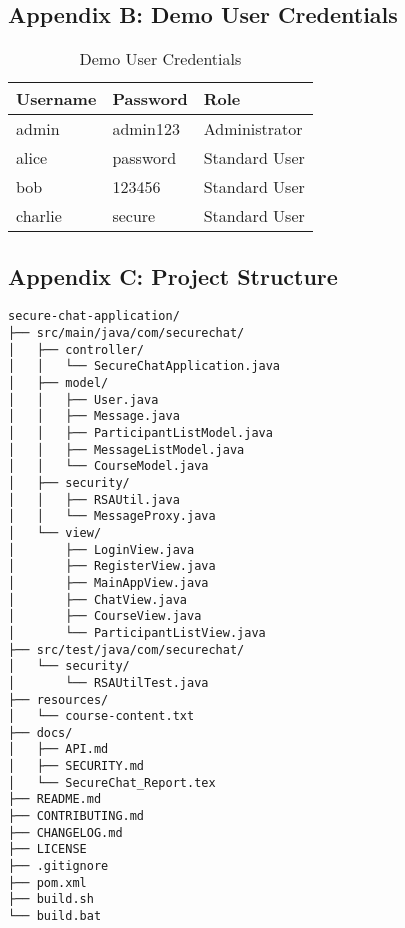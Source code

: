 \documentclass[12pt,a4paper]{article}
\begin{document}
\subsection{Appendix B: Demo User Credentials}
\begin{table}[H]
\centering
\begin{tabular}{|l|l|l|}
\hline
\textbf{Username} & \textbf{Password} & \textbf{Role} \\
\hline
admin & admin123 & Administrator \\
alice & password & Standard User \\
bob & 123456 & Standard User \\
charlie & secure & Standard User \\
\hline
\end{tabular}
\caption{Demo User Credentials}
\label{tab:demo_users}
\end{table}

\subsection{Appendix C: Project Structure}
\begin{lstlisting}[caption=Project Directory Structure]
secure-chat-application/
├── src/main/java/com/securechat/
│   ├── controller/
│   │   └── SecureChatApplication.java
│   ├── model/
│   │   ├── User.java
│   │   ├── Message.java
│   │   ├── ParticipantListModel.java
│   │   ├── MessageListModel.java
│   │   └── CourseModel.java
│   ├── security/
│   │   ├── RSAUtil.java
│   │   └── MessageProxy.java
│   └── view/
│       ├── LoginView.java
│       ├── RegisterView.java
│       ├── MainAppView.java
│       ├── ChatView.java
│       ├── CourseView.java
│       └── ParticipantListView.java
├── src/test/java/com/securechat/
│   └── security/
│       └── RSAUtilTest.java
├── resources/
│   └── course-content.txt
├── docs/
│   ├── API.md
│   ├── SECURITY.md
│   └── SecureChat_Report.tex
├── README.md
├── CONTRIBUTING.md
├── CHANGELOG.md
├── LICENSE
├── .gitignore
├── pom.xml
├── build.sh
└── build.bat
\end{lstlisting}
\end{document}
